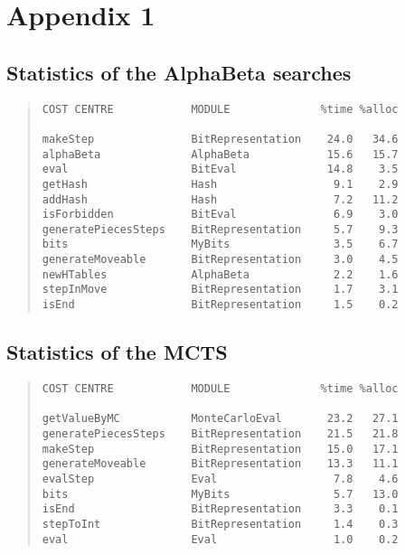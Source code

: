 \chapter{Appendix 1}\label{statistics}

\section{Statistics of the AlphaBeta searches}
\begin{quote}
\begin{verbatim}
COST CENTRE            MODULE              %time %alloc

makeStep               BitRepresentation    24.0   34.6
alphaBeta              AlphaBeta            15.6   15.7
eval                   BitEval              14.8    3.5
getHash                Hash                  9.1    2.9
addHash                Hash                  7.2   11.2
isForbidden            BitEval               6.9    3.0
generatePiecesSteps    BitRepresentation     5.7    9.3
bits                   MyBits                3.5    6.7
generateMoveable       BitRepresentation     3.0    4.5
newHTables             AlphaBeta             2.2    1.6
stepInMove             BitRepresentation     1.7    3.1
isEnd                  BitRepresentation     1.5    0.2
\end{verbatim}
\end{quote}

\section{Statistics of the MCTS}
\begin{quote}
\begin{verbatim}
COST CENTRE            MODULE              %time %alloc

getValueByMC           MonteCarloEval       23.2   27.1
generatePiecesSteps    BitRepresentation    21.5   21.8
makeStep               BitRepresentation    15.0   17.1
generateMoveable       BitRepresentation    13.3   11.1
evalStep               Eval                  7.8    4.6
bits                   MyBits                5.7   13.0
isEnd                  BitRepresentation     3.3    0.1
stepToInt              BitRepresentation     1.4    0.3
eval                   Eval                  1.0    0.2
\end{verbatim}
\end{quote}


